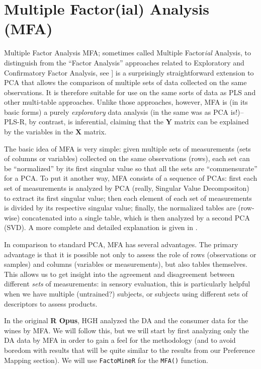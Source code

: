\documentclass[
]{book}
\begin{document}
\chapter{Multiple Factor(ial) Analysis (MFA)}\label{multiple-factorial-analysis-mfa}

Multiple Factor Analysis MFA; sometimes called Multiple Factor\emph{ial} Analysis, to distinguish from the ``Factor Analysis'' approaches related to Exploratory and Confirmatory Factor Analysis, see \citet{rencherMethods2002}{]} is a surprisingly straightforward extension to PCA that allows the comparison of multiple sets of data collected on the same observations. It is therefore suitable for use on the same sorts of data as PLS and other multi-table approaches. Unlike those approaches, however, MFA is (in its basic forms) a purely \emph{exploratory} data analysis (in the same was as PCA is!)--PLS-R, by contrast, is inferential, claiming that the \(\mathbf{Y}\) matrix can be explained by the variables in the \(\mathbf{X}\) matrix.

The basic idea of MFA is very simple: given multiple sets of measurements (sets of columns or variables) collected on the same observations (rows), each set can be ``normalized'' by its first singular value so that all the sets are ``commensurate'' for a PCA. To put it another way, MFA consists of a sequence of PCAs: first each set of measurements is analyzed by PCA (really, Singular Value Decompositon) to extract its first singular value; then each element of each set of measurements is divided by its respective singular value; finally, the normalized tables are (row-wise) concatenated into a single table, which is then analyzed by a second PCA (SVD). A more complete and detailed explanation is given in \citet{abdiMultiple2013}.

In comparison to standard PCA, MFA has several advantages. The primary advantage is that it is possible not only to assess the role of rows (observations or samples) and columns (variables or measurements), but also tables themselves. This allows us to get insight into the agreement and disagreement between different \emph{sets} of measurements: in sensory evaluation, this is particularly helpful when we have multiple (untrained?) subjects, or subjects using different sets of descriptors to assess products.

In the original \textbf{R Opus}, HGH analyzed the DA and the consumer data for the wines by MFA. We will follow this, but we will start by first analyzing only the DA data by MFA in order to gain a feel for the methodology (and to avoid boredom with results that will be quite similar to the results from our Preference Mapping section). We will use \texttt{FactoMineR} for the \texttt{MFA()} function.
\end{document}
